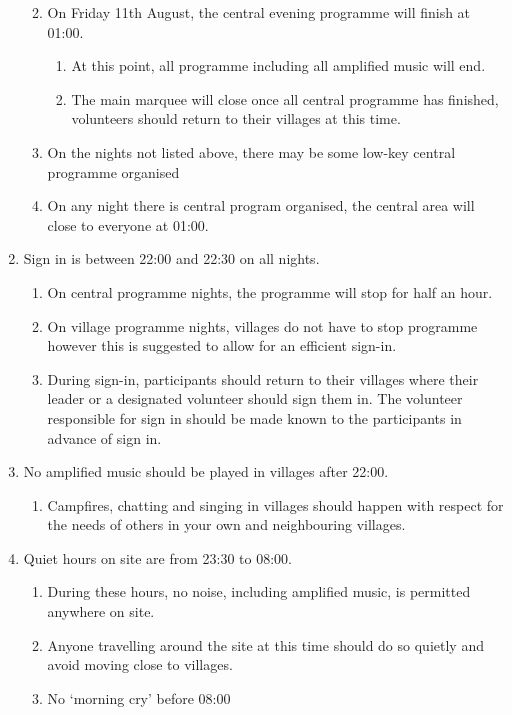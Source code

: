 \documentclass[a4paper, 11pt]{report}
\def\enumMarginIndentOne{4em}
\def\enumMarginIndentTwo{5em}
\begin{document}
\begin{enumerate}
\begin{enumerate}[leftmargin=\enumMarginIndentOne]
\begin{enumerate}[leftmargin=\enumMarginIndentTwo]
            \end{enumerate}
            \item On Friday 11th August, the central evening programme will finish at 01:00.
            \begin{enumerate}[leftmargin=\enumMarginIndentTwo]
                \item At this point, all programme including all amplified music will end. 
                \item The main marquee will close once all central programme has finished, volunteers should return to their villages at this time.
            \end{enumerate}
            \item On the nights not listed above, there may be some low-key central programme organised
            \item On any night there is central program organised, the central area will close to everyone at 01:00. 
        \end{enumerate}
        \item Sign in is between 22:00 and 22:30 on all nights.
        \begin{enumerate}[leftmargin=\enumMarginIndentOne]
            \item On central programme nights, the programme will stop for half an hour.
            \item On village programme nights, villages do not have to stop programme however this is suggested to allow for an efficient sign-in.
            \item During sign-in, participants should return to their villages where their leader or a designated volunteer should sign them in. The volunteer responsible for sign in should be made known to the participants in advance of sign in.
        \end{enumerate}
        \item No amplified music should be played in villages after 22:00.
        \begin{enumerate}[leftmargin=\enumMarginIndentOne]
            \item Campfires, chatting and singing in villages should happen with respect for the needs of others in your own and neighbouring villages.
        \end{enumerate}
        \item Quiet hours on site are from 23:30 to 08:00.
        \begin{enumerate}[leftmargin=\enumMarginIndentOne]
            \item During these hours, no noise, including amplified music, is permitted anywhere on site.
            \item Anyone travelling around the site at this time should do so quietly and avoid moving close to villages.
            \item No `morning cry' before 08:00
        \end{enumerate}
    \end{enumerate}
\end{document}
